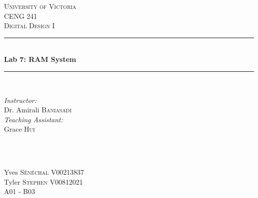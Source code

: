 \documentclass[11pt]{article}
\newcommand{\HRule}{\rule{\linewidth}{0.5mm}}
\begin{document}

\begin{titlepage}

\center
 
\textsc{\LARGE University of Victoria}\\[1cm] 	%
\textsc{\Large CENG 241}\\[0.5cm] 			%
\textsc{\large Digital Design I}\\[0.5cm] 		%


\HRule \\[0.4cm]
{\huge \bfseries Lab 7:  RAM System}\\[0.2cm] %
\HRule \\[1.5cm]
 
 
\begin{minipage}{0.7\textwidth}
\begin{flushleft} 

\large\emph{Instructor:} \\
Dr. Amirali \textsc{Baniasadi} \\
\vspace{12 pt}
\emph{Teaching Assistant:} \\
Grace \textsc{Hui}

\end{flushleft}
\end{minipage}
~
\begin{minipage}{0.1\textwidth}
\begin{flushright} \large
\vspace{12 pt}
\end{flushright}
\end{minipage}\\[2cm]


\Large Yves \textsc{S\'{e}n\'{e}chal}
\large V00213837	\\
\Large Tyler \textsc{Stephen}
\large V00812021	\\
A01 - B03\\[1.5cm] 



\end{titlepage}
\end{document}
